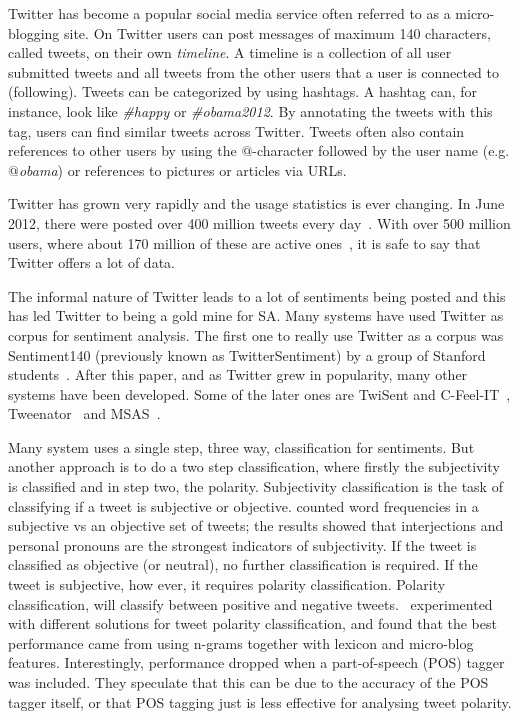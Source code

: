 Twitter has become a popular social media service often referred to as a micro-blogging site. On Twitter users can post messages of maximum 140 characters, called tweets, on their own \emph{timeline}. A timeline is a collection of all user submitted tweets and all tweets from the other users that a user is connected to (following). Tweets can be categorized by using hashtags. A hashtag can, for instance, look like \emph{\#happy} or \emph{\#obama2012}. By annotating the tweets with this tag, users can find similar tweets across Twitter. Tweets often also contain references to other users by using the $@$-character followed by the user name (e.g. \emph{$@$obama}) or references to pictures or articles via URLs.

Twitter has grown very rapidly and the usage statistics is ever changing. In June 2012, there were posted over 400 million tweets every day~\citep{site:twitterusage}. With over 500 million users, where about 170 million of these are active ones~\citep{site:users}, it is safe to say that Twitter offers a lot of data.

The informal nature of Twitter leads to a lot of sentiments being posted and this has led Twitter to being a gold mine for SA. Many systems have used Twitter as corpus for sentiment analysis. The first one to really use Twitter as a corpus was Sentiment140 (previously known as TwitterSentiment) by a group of Stanford students~\citep{article:go}. After this paper, and as Twitter grew in popularity, many other systems have been developed. Some of the later ones are TwiSent and C-Feel-IT~\citep{mukherjee2012twisent}, Tweenator~\citep{saif2012semantic} and MSAS~\citep{chamlertwat2012discovering}.

Many system uses a single step, three way, classification for sentiments. But another approach is to do a two step classification, where firstly the subjectivity is classified and in step two, the polarity. Subjectivity classification is the task of classifying if a tweet is subjective or objective. \cite{article:pak} counted word frequencies in a subjective vs an objective set of tweets; the results showed that interjections and personal pronouns are the strongest indicators of subjectivity. If the tweet is classified as objective (or neutral), no further classification is required. If the tweet is subjective, how ever, it requires polarity classification. Polarity classification, will classify between positive and negative tweets.~\cite{article:omg} experimented with different solutions for tweet polarity classification, and found that the best performance came from using n-grams together with lexicon and micro-blog features. Interestingly, performance dropped when a part-of-speech (POS) tagger was included. They speculate that this can be due to the accuracy of the POS tagger itself, or that POS tagging just is less effective for analysing tweet polarity.

